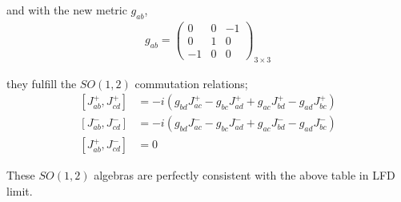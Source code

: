 \documentclass[]{article}
\numberwithin{equation}{section}
\begin{document}
{{and with the new metric $g_{ab}$,
\begin{align}
    g_{ab}= \begin{pmatrix}
            0&0&-1\\
            0&1&0\\
            -1&0&0
            \end{pmatrix}_{3\times3}
\end{align}


they fulfill the $SO(1,2)$ commutation relations;
\begin{align}
      \left[J^{+}_{{a}{b}},J^{+}_{{c}{d}}\right]&=-i\left(g_{{b}{d}}J^{+}_{{a}{c}}-g_{{b}{c}}J^{+}_{{a}{d}}+g_{{a}{c}}J^{+}_{{b}{d}}-g_{{a}{d}}J^{+}_{{b}{c}}\right)\\
      \left[J^{-}_{{a}{b}},J^{-}_{{c}{d}}\right]&=-i\left(g_{{b}{d}}J^{-}_{{a}{c}}-g_{{b}{c}}J^{-}_{{a}{d}}+g_{{a}{c}}J^{-}_{{b}{d}}-g_{{a}{d}}J^{-}_{{b}{c}}\right)\\
      \left[J^{+}_{{a}{b}},J^{-}_{{c}{d}}\right]&=0
  \end{align}

These $SO(1,2)$ algebras are perfectly consistent with the above table in LFD limit.

}}
\end{document}
